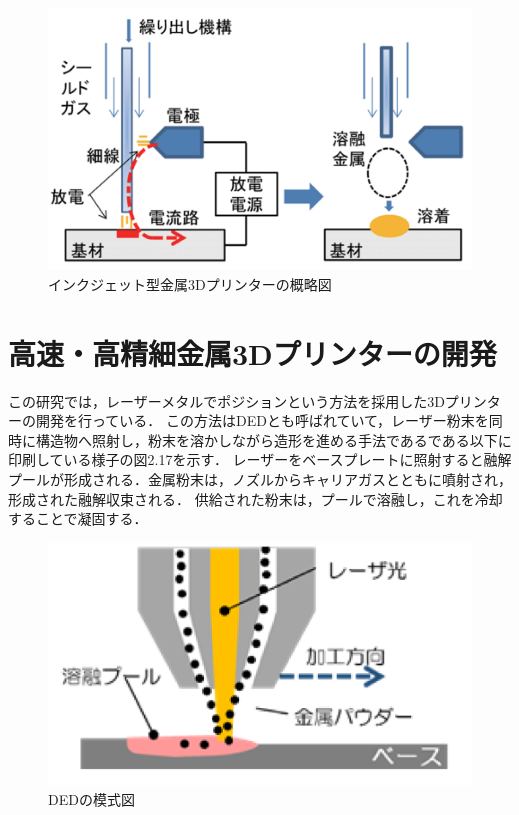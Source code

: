\begin{figure}[H]
  \centering
  \includegraphics[width=10truecm]{./fig/houdenn.png}
  \caption{インクジェット型金属3Dプリンターの概略図}
  \label{fig:ferret}
\end{figure}



\section{高速・高精細金属3Dプリンターの開発\cite{k}}
\label{sec:enum}
この研究では，レーザーメタルでポジションという方法を採用した3Dプリンターの開発を行っている．
この方法はDEDとも呼ばれていて，レーザー粉末を同時に構造物へ照射し，粉末を溶かしながら造形を進める手法であるである以下に印刷している様子の図2.17を示す．
レーザーをベースプレートに照射すると融解プールが形成される．金属粉末は，ノズルからキャリアガスとともに噴射され，形成された融解収束される．
供給された粉末は，プールで溶融し，これを冷却することで凝固する．

\begin{figure}[H]
  \centering
  \includegraphics[width=9truecm]{./fig/kinnzoku.png}
  \caption{DEDの模式図}
  \label{fig:ferret}
\end{figure}

